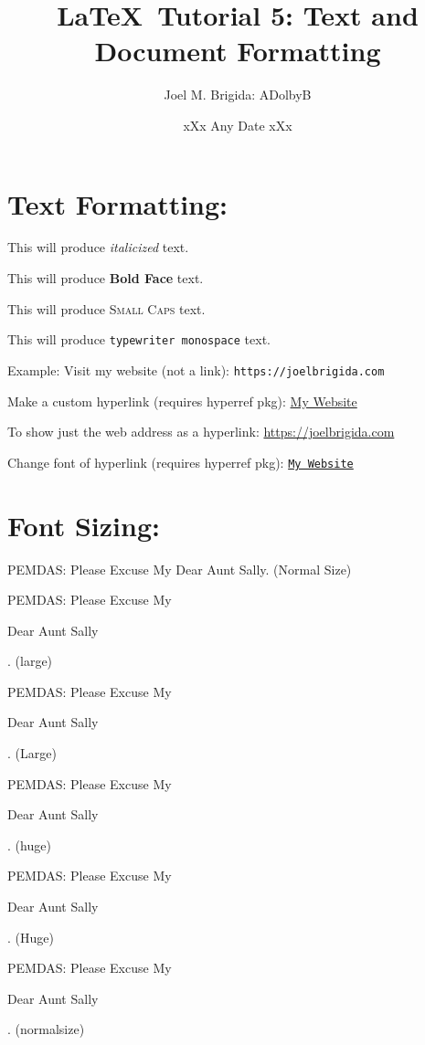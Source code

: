 \documentclass[11pt]{article}
\title{\LaTeX\ Tutorial 5: Text and Document Formatting}
\author{Joel M. Brigida: ADolbyB}
\date{xXx Any Date xXx} %
\begin{document}
\maketitle %
\tableofcontents
\thispagestyle{empty} %

\pagebreak

\section{Text Formatting:}

This will produce \textit{italicized} text.

This will produce \textbf{Bold Face} text.

This will produce \textsc{Small Caps} text.

This will produce \texttt{typewriter monospace} text.

\hspace{\parindent}Example: Visit my website (not a link): \texttt{https://joelbrigida.com}

Make a custom hyperlink (requires hyperref pkg): \href{https://joelbrigida.com}{My Website}

To show just the web address as a hyperlink: \url{https://joelbrigida.com}

Change font of hyperlink (requires hyperref pkg): \texttt{\href{https://joelbrigida.com}{My Website}}


\section{Font Sizing:}

PEMDAS: Please Excuse My Dear Aunt Sally. (Normal Size)

PEMDAS: Please Excuse My \begin{large}Dear Aunt Sally\end{large}. (large)

PEMDAS: Please Excuse My \begin{Large}Dear Aunt Sally\end{Large}. (Large)

PEMDAS: Please Excuse My \begin{huge}Dear Aunt Sally\end{huge}. (huge)

PEMDAS: Please Excuse My \begin{Huge}Dear Aunt Sally\end{Huge}. (Huge)

PEMDAS: Please Excuse My \begin{normalsize}Dear Aunt Sally\end{normalsize}. (normalsize)
\end{document}
